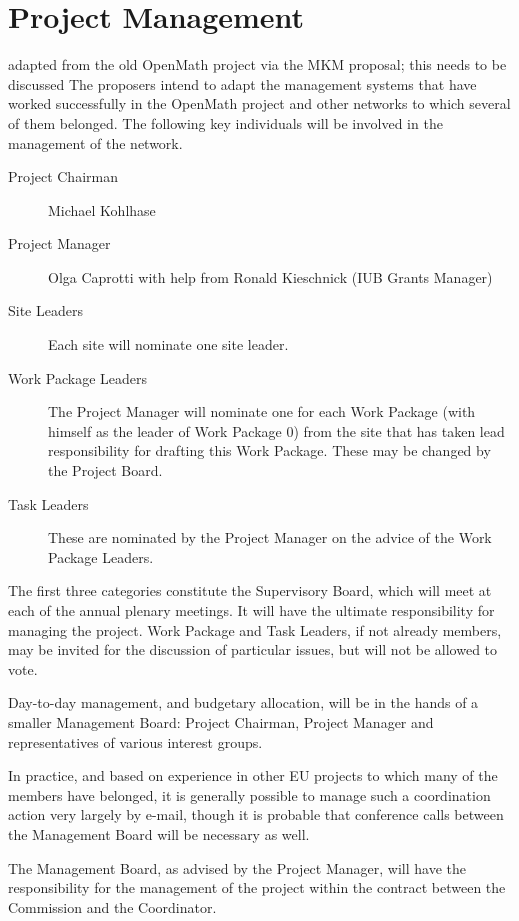 \documentclass{euproposal}
\begin{document}
\chapter{Project Management}\label{cha:management}
\begin{newpart}{adapted from the old OpenMath project via the MKM proposal; this
    needs to be discussed} The proposers intend to adapt the
  management systems that have worked successfully in the OpenMath
  project and other networks to which several of them belonged. The
  following key individuals will be involved in the management of the
  network.
\begin{description}
\item[Project Chairman] Michael Kohlhase
\item[Project Manager] Olga Caprotti with help from Ronald Kieschnick
  (IUB Grants Manager)
\item[Site Leaders] Each site will nominate one site leader.
\item[Work Package Leaders] The Project Manager will nominate one for each Work
  Package (with himself as the leader of Work Package 0) from the site that has
  taken lead responsibility for drafting this Work Package. These may be changed
  by the Project Board.
\item[Task Leaders] These are nominated by the Project Manager on the advice of
  the Work Package Leaders.
\end{description}
The first three categories constitute the Supervisory Board, which
will meet at each of the annual plenary meetings.  It will have the
ultimate responsibility for managing the project. Work Package and
Task Leaders, if not already members, may be invited for the
discussion of particular issues, but will not be allowed to vote.
   
Day-to-day management, and budgetary allocation, will be in the hands
of a smaller Management Board: Project Chairman, Project Manager and
representatives of various interest groups.

In practice, and based on experience in other EU projects to which
many of the members have belonged, it is generally possible to manage
such a coordination action very largely by e-mail, though it is
probable that conference calls between the Management Board will be
necessary as well.
  
The Management Board, as advised by the Project Manager, will have the
responsibility for the management of the project within the contract
between the Commission and the Coordinator.
  

\end{newpart}
\end{document}
